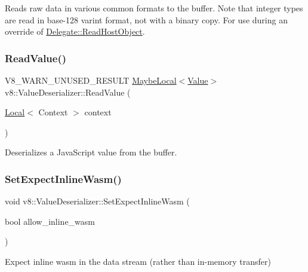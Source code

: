 Reads raw data in various common formats to the buffer. Note that integer types are read in base-\/128 varint format, not with a binary copy. For use during an override of \mbox{\hyperlink{classv8_1_1ValueDeserializer_1_1Delegate_a8b06c19cba7e80c3c5271b0a2ca88a8a}{Delegate\+::\+Read\+Host\+Object}}. \mbox{\label{classv8_1_1ValueDeserializer_ad1697f04cf0fae2f80d5750d6fe9c4da}} 
\subsubsection{\texorpdfstring{Read\+Value()}{ReadValue()}}
{\footnotesize\ttfamily V8\+\_\+\+W\+A\+R\+N\+\_\+\+U\+N\+U\+S\+E\+D\+\_\+\+R\+E\+S\+U\+LT \mbox{\hyperlink{classv8_1_1MaybeLocal}{Maybe\+Local}}$<$\mbox{\hyperlink{classv8_1_1Value}{Value}}$>$ v8\+::\+Value\+Deserializer\+::\+Read\+Value (\begin{DoxyParamCaption}\item[{\mbox{\hyperlink{classv8_1_1Local}{Local}}$<$ Context $>$}]{context }\end{DoxyParamCaption})}

Deserializes a Java\+Script value from the buffer. \mbox{\label{classv8_1_1ValueDeserializer_a2e393ea834f217238fc144f48fd5caf1}} 
\subsubsection{\texorpdfstring{Set\+Expect\+Inline\+Wasm()}{SetExpectInlineWasm()}}
{\footnotesize\ttfamily void v8\+::\+Value\+Deserializer\+::\+Set\+Expect\+Inline\+Wasm (\begin{DoxyParamCaption}\item[{bool}]{allow\+\_\+inline\+\_\+wasm }\end{DoxyParamCaption})}

Expect inline wasm in the data stream (rather than in-\/memory transfer) \mbox{\label{classv8_1_1ValueDeserializer_a076d92b67d68c64404f1065d0dcd85b6}} 
